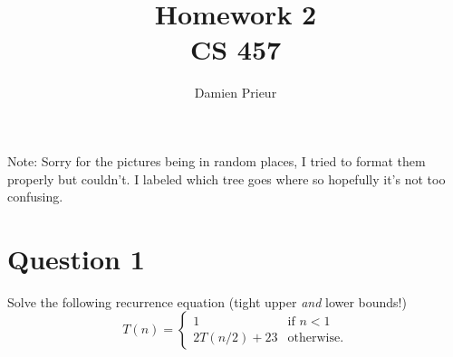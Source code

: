 \documentclass{article}
\author{Damien Prieur}
\title{Homework 2 \\ CS 457}
\date{}
\begin{document}
\maketitle

Note: Sorry for the pictures being in random places, I tried to format them properly but couldn't.
I labeled which tree goes where so hopefully it's not too confusing.

\section*{Question 1}
Solve the following recurrence equation (tight upper \emph{and} lower bounds!)
\begin{equation*}
T(n)=
\begin{cases}
1 &\text{if $n< 1$}\\
2T(n/2)+23 &\text{otherwise.}
\end{cases}
\end{equation*}
\end{document}
